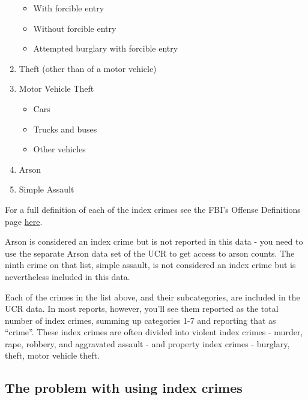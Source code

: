 \documentclass[
  12pt,
]{book}
\providecommand{\tightlist}{%
  \setlength{\itemsep}{0pt}\setlength{\parskip}{0pt}}
\begin{document}
\begin{enumerate}
  \begin{itemize}
  \tightlist
  \item
    With forcible entry\\
  \item
    Without forcible entry\\
  \item
    Attempted burglary with forcible entry\\
  \end{itemize}
\item
  Theft (other than of a motor vehicle)\\
\item
  Motor Vehicle Theft

  \begin{itemize}
  \tightlist
  \item
    Cars\\
  \item
    Trucks and buses\\
  \item
    Other vehicles\\
  \end{itemize}
\item
  Arson\\
\item
  Simple Assault
\end{enumerate}

For a full definition of each of the index crimes see the FBI's Offense Definitions page \href{https://ucrdatatool.gov/offenses.cfm}{here}.

Arson is considered an index crime but is not reported in this data - you need to use the separate Arson data set of the UCR to get access to arson counts. The ninth crime on that list, simple assault, is not considered an index crime but is nevertheless included in this data.

Each of the crimes in the list above, and their subcategories, are included in the UCR data. In most reports, however, you'll see them reported as the total number of index crimes, summing up categories 1-7 and reporting that as ``crime''. These index crimes are often divided into violent index crimes - murder, rape, robbery, and aggravated assault - and property index crimes - burglary, theft, motor vehicle theft.

\hypertarget{the-problem-with-using-index-crimes}{%
\subsection{The problem with using index crimes}\label{the-problem-with-using-index-crimes}}
\end{document}
